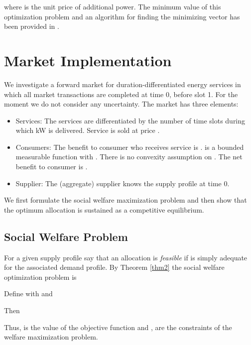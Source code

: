 \documentclass[10pt,draftcls,onecolumn]{IEEEtran}
\newcounter{l1}
\newcounter{l2}
\newcounter{l3}
\begin{document}
where  is the unit price of additional power.  The minimum value of this optimization problem and an algorithm for finding the minimizing vector  has been provided in \cite{dd2013}.









\section{Market Implementation}\label{sec-market}

We investigate a forward market for duration-differentiated energy services in which  all market transactions are completed at time 0, before slot 1. For the moment we do not consider any uncertainty.  The market has three elements:

\begin{itemize}

\item Services: The services  are differentiated by the number  of time slots during which  kW  is delivered.  Service  is sold at price .

\item Consumers:  The benefit to consumer  who receives service  is  .   is a bounded measurable function with .  There is no convexity assumption on .  The net benefit to consumer  is .


\item Supplier: The (aggregate) supplier knows the  supply profile  at time 0. 


\end{itemize}




We first formulate the  social welfare maximization problem and then show that the optimum  allocation is sustained as a competitive equilibrium. 


\subsection{Social Welfare Problem}

For a given supply profile  say that
an allocation   is \textit{feasible} if  is simply adequate for the associated demand profile. By Theorem \ref{thm2} the social welfare optimization problem is

Define  with  and 

Then

Thus,  is the value of the objective function and  ,  are the constraints of the  welfare maximization problem.
 
\end{document}
